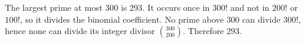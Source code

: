 The largest prime at most 300 is 293. It occurs once in $300!$ and not in $200!$ or $100!$, so it divides the binomial coefficient. No prime above 300 can divide $300!$, hence none can divide its integer divisor $\binom{300}{200}$. Therefore $\boxed{293}$.
